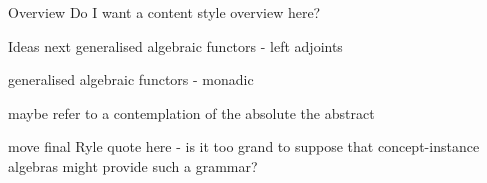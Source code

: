 \begin{frame}
\titlepage
{}
\end{frame}


\begin{frame}{Overview}
Do I want a content style overview here?
\end{frame}



























\begin{frame}{Ideas next}
generalised algebraic functors - left adjoints

generalised algebraic functors - monadic

maybe refer to a contemplation of the absolute the abstract

move final Ryle quote here - is it too grand to suppose that concept-instance algebras might provide such a grammar?
\end{frame}

